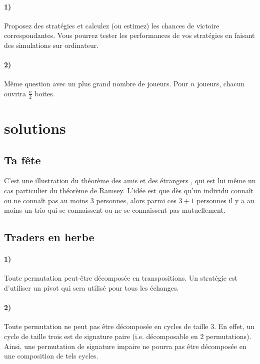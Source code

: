\documentclass[a4paper,10pt,oneside]{article}
\begin{document}
\paragraph*{1)}
Proposez des stratégies et calculez (ou estimez) les chances de victoire correspondantes.
Vous pourrez tester les performances de vos stratégies en faisant des simulations sur ordinateur.

\paragraph*{2)} 
Même question avec un plus grand nombre de joueurs. Pour $n$ joueurs, chacun ouvrira $\frac{n}{2}$ boites.


\section{solutions}

\subsection{Ta fête}

C'est une illustration du 
\href{
  https://fr.wikipedia.org/wiki/Th%
}{théorème des amis et des étrangers}
, qui est lui même un cas particulier du
\href{
  https://fr.wikipedia.org/wiki/Th%
}{théorème de Ramsey}.
L'idée est que dès qu'un individu connaît ou ne connaît pas au moins $3$ personnes, alors parmi ces $3+1$ personnes il y a au moins un trio qui se connaissent ou ne se connaissent pas mutuellement.

\subsection{Traders en herbe}

\paragraph*{1)}
Toute permutation peut-être décomposée en transpositions. 
Un stratégie est d'utiliser un pivot qui sera utilisé pour tous les échanges.

\paragraph*{2)} 
Toute permutation ne peut pas être décomposée en cycles de taille 3. 
En effet, un cycle de taille trois est de signature paire (i.e. décomposable en 2 permutations).
Ainsi, une permutation de signature impaire ne pourra pas être décomposée en une composition de tels cycles.
\end{document}
